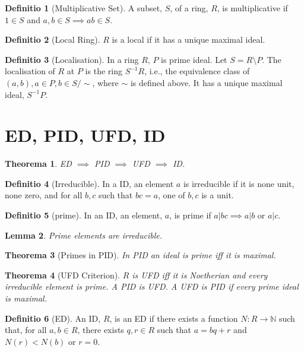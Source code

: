 \documentclass[12pt, a4paper]{article}
\newtheorem{theorem}{Theorema}
\newtheorem{lemma}[theorem]{Lemma}
\theoremstyle{definition}
\newtheorem{definition}{Definitio}
\theoremstyle{remark}
\newcommand{\bb}[1]{\mathbb{#1}}
\begin{document}
\begin{definition}[Multiplicative Set]
	A subset, $S$, of a ring, $R$, is multiplicative if $1 \in S$ and $a,b \in S \implies ab \in S$.
\end{definition}

\begin{definition}[Local Ring]
	$R$ is a local if it has a unique maximal ideal.
\end{definition}

\begin{definition}[Localisation]
	In a ring $R$, $P$ is prime ideal.
	Let $S = R \setminus P$. 
	The localisation of $R$ at $P$ is the ring $S^{-1}R$, i.e., the equivalence class of $(a,b), a \in P, b \in S \slash \sim$, where $\sim$ is defined above.
	It has a unique maximal ideal, $S^{-1}P$.
\end{definition}

\section{ED, PID, UFD, ID}

\begin{theorem}
	ED $\implies$ PID $\implies$ UFD $\implies$ ID. 
\end{theorem}

\begin{definition}[Irreducible]
	In a ID, an element $a$ is irreducible if it is none unit, none zero, and for all $b,c$ such that $bc =a $, one of $b,c$ is a unit.
\end{definition}

\begin{definition}[prime]
	In an ID, an element, $a$, is prime if $a|bc \implies a|b$ or $a|c$.
\end{definition}

\begin{lemma}
	Prime elements are irreducible.
\end{lemma}

\begin{theorem}[Primes in PID]
	In PID an ideal is prime iff it is maximal.
\end{theorem}

\begin{theorem}[UFD Criterion]
	$R$ is UFD iff it is Noetherian and every irreducible element is prime.
	A PID is UFD.
	A UFD is PID if every prime ideal is maximal.
\end{theorem}

\begin{definition}[ED]
	An ID, $R$, is an ED if there exists a function $N: R \to \bb{N}$ such that, for all $a,b \in R$, there exists $q,r \in R$ such that $a = bq + r$ and $N(r) < N(b)$ or $r = 0$.
\end{definition}
\end{document}
